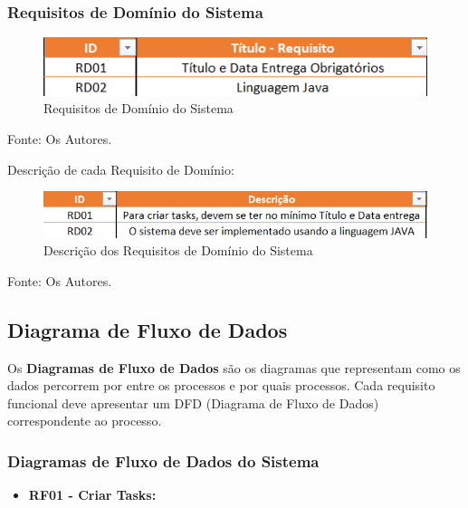 \documentclass[a4paper,12pt]{article}
\begin{document}
\subsubsection{Requisitos de Domínio do Sistema}
\begin{figure}[H]
	\centering
	\includegraphics[scale=0.80]{requirements/domain/domain.png}
	\caption{Requisitos de Domínio do Sistema}
\end{figure}
\noindent Fonte: Os Autores.


Descrição de cada Requisito de Domínio:
\begin{figure}[H]
	\centering
	\includegraphics[scale=0.80]{requirements/domain/description.png}
	\caption{Descrição dos Requisitos de Domínio do Sistema}
\end{figure}
\noindent Fonte: Os Autores.

\subsection{Diagrama de Fluxo de Dados}
Os \textbf{Diagramas de Fluxo de Dados} são os diagramas que representam como os dados percorrem por entre os processos e por quais processos. 
Cada requisito funcional deve apresentar um DFD (Diagrama de Fluxo de Dados) correspondente ao processo.

\pagebreak
\subsubsection{Diagramas de Fluxo de Dados do Sistema}
\begin{itemize}
\item\textbf{RF01 - Criar Tasks:}
\end{itemize}
\end{document}

